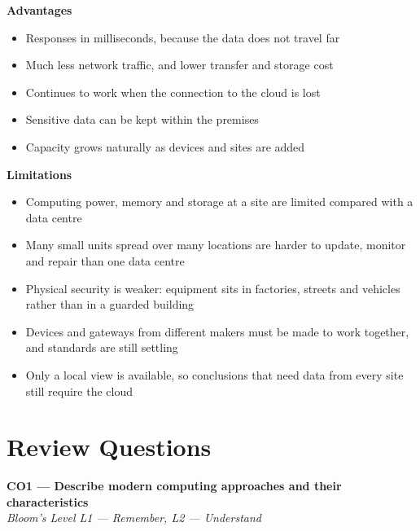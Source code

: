 \documentclass[../main.tex]{subfiles}
\begin{document}
\textbf{Advantages}
\begin{itemize}
  \item Responses in milliseconds, because the data does not travel far
  \item Much less network traffic, and lower transfer and storage cost
  \item Continues to work when the connection to the cloud is lost
  \item Sensitive data can be kept within the premises
  \item Capacity grows naturally as devices and sites are added
\end{itemize}

\textbf{Limitations}
\begin{itemize}
  \item Computing power, memory and storage at a site are limited compared
        with a data centre
  \item Many small units spread over many locations are harder to update,
        monitor and repair than one data centre
  \item Physical security is weaker: equipment sits in factories, streets and
        vehicles rather than in a guarded building
  \item Devices and gateways from different makers must be made to work
        together, and standards are still settling
  \item Only a local view is available, so conclusions that need data from
        every site still require the cloud
\end{itemize}

\section{Review Questions}

\textbf{CO1 --- Describe modern computing approaches and their
characteristics}\\
\textit{Bloom's Level L1 --- Remember, L2 --- Understand}
\end{document}
